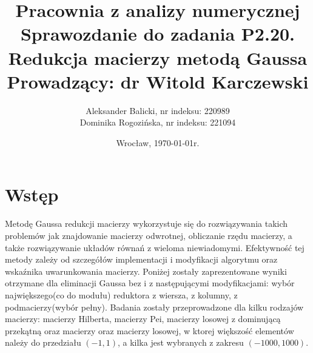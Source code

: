 \documentclass[a4paper,10pt]{article}
\title{{\textbf{Pracownia z analizy numerycznej}}\\[1ex]
       {\Large Sprawozdanie do zadania \textbf{P2.20.}}\\[-1ex]
       {\Large Redukcja macierzy metodą Gaussa}\\
       {\large Prowadzący: dr Witold Karczewski}}
\author{Aleksander Balicki, \large nr indeksu: 220989\\
	Dominika Rogozińska, \large nr indeksu: 221094}
\date{Wrocław, \today r.}
\begin{document}
\maketitle

\section{Wstęp}
\setcounter{equation}{0}
Metodę Gaussa redukcji macierzy wykorzystuje się do rozwiązywania takich problemów jak znajdowanie macierzy odwrotnej, obliczanie rzędu macierzy, a także rozwiązywanie układów równań z wieloma niewiadomymi. Efektywność tej metody zależy od szczegółów implementacji i modyfikacji algorytmu oraz wskaźnika uwarunkowania macierzy. Poniżej zostały zaprezentowane wyniki otrzymane dla eliminacji Gaussa bez i z następującymi modyfikacjami: wybór największego(co do modułu) reduktora z wiersza, z kolumny, z podmacierzy(wybór pełny). Badania zostały przeprowadzone dla kilku rodzajów macierzy: macierzy Hilberta, macierzy Pei, macierzy losowej z dominującą przekątną oraz macierzy oraz macierzy losowej, w ktorej większość elementów należy do przedziału $(-1,1)$, a kilka jest wybranych z zakresu $(-1000,1000)$.
\end{document}

